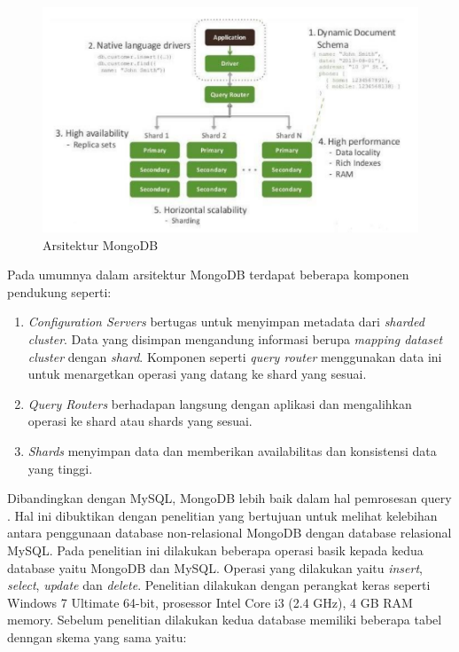 \begin{figure}[H]
	\centering
	\includegraphics[keepaspectratio, width=16cm]{gambar/arsitektur-mongodb}
	\caption{Arsitektur MongoDB}
	\label{gambar:arsitektur-mongodb}
\end{figure}

Pada umumnya dalam arsitektur MongoDB terdapat beberapa komponen pendukung seperti:
\begin{enumerate}
	\item{\emph{Configuration Servers} bertugas untuk menyimpan metadata dari \textit{sharded cluster}. Data yang disimpan mengandung informasi berupa \textit{mapping dataset cluster} dengan \textit{shard}. Komponen seperti \textit{query router} menggunakan data ini untuk menargetkan operasi yang datang ke shard yang sesuai.} 
	\item{\emph{Query Routers}  berhadapan langsung dengan aplikasi dan mengalihkan operasi ke shard atau shards yang sesuai.} 
	\item {\emph{Shards} menyimpan data dan memberikan availabilitas dan konsistensi data yang tinggi.}
\end{enumerate}

Dibandingkan dengan MySQL, MongoDB lebih baik dalam hal pemrosesan query \citep{mongoarchitecture2}. Hal ini dibuktikan dengan penelitian yang bertujuan untuk melihat kelebihan antara penggunaan database non-relasional MongoDB dengan database relasional MySQL. Pada penelitian ini dilakukan beberapa operasi basik kepada kedua database yaitu MongoDB dan MySQL. Operasi yang dilakukan yaitu \textit{insert}, \textit{select}, \textit{update} dan \textit{delete}. Penelitian dilakukan dengan perangkat keras seperti Windows 7
Ultimate 64-bit, prosessor Intel Core i3 (2.4 GHz), 4 GB RAM memory. Sebelum penelitian dilakukan kedua database memiliki beberapa tabel denngan skema yang sama yaitu:

